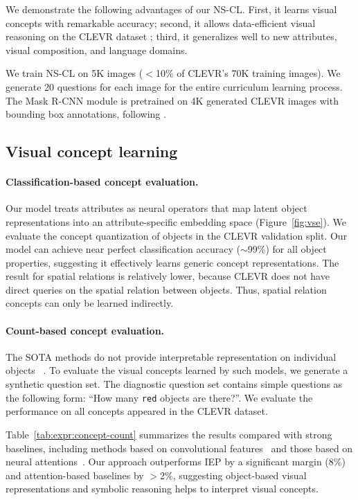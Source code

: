 \documentclass{article} \usepackage{iclr2019_conference,times}
\newcommand{\fig}[1]{Figure~\ref{#1}}
\newcommand{\tbl}[1]{Table~\ref{#1}}
\newcommand{\model}{NS-CL\xspace}
\newcommand{\myparagraph}[1]{\vspace{-3pt}\paragraph{#1}}
\begin{document}
We demonstrate the following advantages of our \model. First, it learns visual concepts with remarkable accuracy; second, it allows data-efficient visual reasoning on the CLEVR dataset \citep{Johnson2017CLEVR}; third, it generalizes well to new attributes, visual composition, and language domains.

We train \model on 5K images ($<$10\% of CLEVR's 70K training images). We generate 20 questions for each image for the entire curriculum learning process. The Mask R-CNN module is pretrained on 4K generated CLEVR images with bounding box annotations, following \citet{kexin}.

\subsection{Visual concept learning}

\paragraph{Classification-based concept evaluation.}

Our model treats attributes as neural operators that map latent object representations into an attribute-specific embedding space (\fig{fig:vse}). We evaluate the concept quantization of objects in the CLEVR validation split. Our model can achieve near perfect classification accuracy ($\sim$99\%) for all object properties, suggesting it effectively learns generic concept representations. The result for spatial relations is relatively lower, because CLEVR does not have direct queries on the spatial relation between objects. Thus, spatial relation concepts can only be learned indirectly.



\myparagraph{Count-based concept evaluation.}
The SOTA methods do not provide interpretable representation on individual objects~\citep{Johnson2017CLEVR,Hudson2018Compositional,Mascharka2018Transparency} . To evaluate the visual concepts learned by such models, we generate a synthetic question set. The diagnostic question set contains simple questions as the following form: ``How many \texttt{red} objects are there?''. We evaluate the performance on all concepts appeared in the CLEVR dataset.

\tbl{tab:expr:concept-count} summarizes the results compared with strong baselines, including methods based on convolutional features~\citep{Johnson2017Inferring} and those based on neural attentions~\citep{Mascharka2018Transparency,Hudson2018Compositional}.
Our approach outperforms IEP by a significant margin (8\%) and attention-based baselines by $>$2\%, suggesting object-based visual representations and symbolic reasoning helps to interpret visual concepts.
\end{document}
